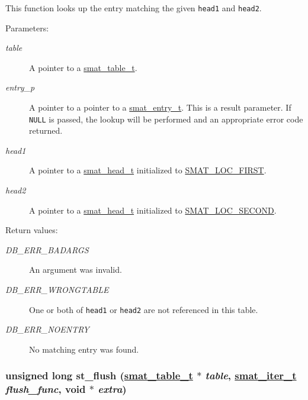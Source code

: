 This function looks up the entry matching the given {\tt head1} and {\tt head2}.\begin{Desc}
\item[Parameters: ]\par
\begin{description}
\item[{\em 
table}]A pointer to a \hyperlink{group__dbprim__smat_a0}{smat\_\-table\_\-t}. \item[{\em 
entry\_\-p}]A pointer to a pointer to a \hyperlink{group__dbprim__smat_a2}{smat\_\-entry\_\-t}. This is a result parameter. If {\tt NULL} is passed, the lookup will be performed and an appropriate error code returned. \item[{\em 
head1}]A pointer to a \hyperlink{group__dbprim__smat_a1}{smat\_\-head\_\-t} initialized to \hyperlink{group__dbprim__smat_a47a135}{SMAT\_\-LOC\_\-FIRST}. \item[{\em 
head2}]A pointer to a \hyperlink{group__dbprim__smat_a1}{smat\_\-head\_\-t} initialized to \hyperlink{group__dbprim__smat_a47a136}{SMAT\_\-LOC\_\-SECOND}.\end{description}
\end{Desc}
\begin{Desc}
\item[Return values: ]\par
\begin{description}
\item[{\em 
DB\_\-ERR\_\-BADARGS}]An argument was invalid. \item[{\em 
DB\_\-ERR\_\-WRONGTABLE}]One or both of {\tt head1} or {\tt head2} are not referenced in this table. \item[{\em 
DB\_\-ERR\_\-NOENTRY}]No matching entry was found. \end{description}
\end{Desc}
\hypertarget{group__dbprim__smat_a14}{
\subsubsection[st\_\-flush]{\setlength{\rightskip}{0pt plus 5cm}unsigned long st\_\-flush (\hyperlink{group__dbprim__smat_a0}{smat\_\-table\_\-t} $\ast$ {\em table}, \hyperlink{group__dbprim__smat_a4}{smat\_\-iter\_\-t} {\em flush\_\-func}, void $\ast$ {\em extra})}}
\label{group__dbprim__smat_a14}


